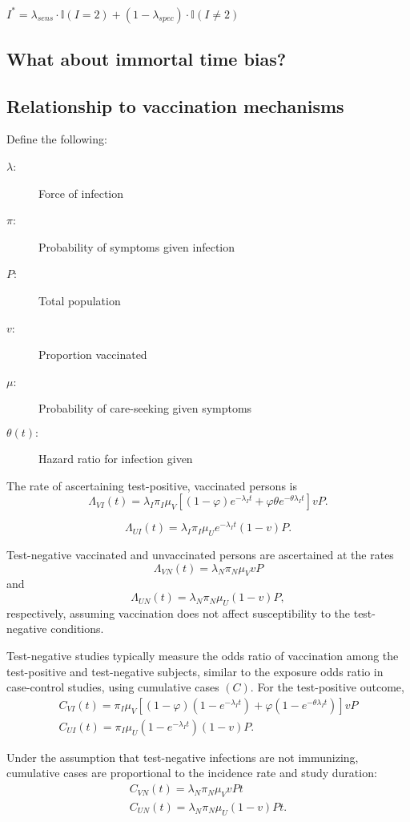 \begin{appendix}
$I^* = \lambda_{sens} \cdot \mathbb{I}(I = 2) + (1 - \lambda_{spec}) \cdot \mathbb{I}(I \neq 2)$

\subsection{What about immortal time bias?}

\subsection{Relationship to vaccination mechanisms}
Define the following:
\begin{description}
    \item[$\lambda$:] Force of infection 
    \item[$\pi$:] Probability of symptoms given infection
    \item[$P$:] Total population 
    \item[$v$:] Proportion vaccinated
    \item[$\mu$:] Probability of care-seeking given symptoms
    \item[$\theta(t):$] Hazard ratio for infection given 
\end{description}
The rate of ascertaining test-positive, vaccinated persons is
$$
\Lambda_{V I}(t)=\lambda_I \pi_I \mu_V[(1-\varphi) e^{-\lambda_I t} + \varphi \theta e^{-\theta \lambda_I t}] v P .
$$

$$
\Lambda_{U I}(t)=\lambda_I \pi_I \mu_U e^{-\lambda_I t}(1-v) P .
$$

Test-negative vaccinated and unvaccinated persons are ascertained at the rates
$$
\Lambda_{V N}(t)=\lambda_N \pi_N \mu_V v P
$$
and
$$
\Lambda_{U N}(t)=\lambda_N \pi_N \mu_U(1-v) P,
$$
respectively, assuming vaccination does not affect susceptibility to the test-negative conditions.

Test-negative studies typically measure the odds ratio of vaccination among the test-positive and test-negative subjects, similar to the exposure odds ratio in case-control studies, using cumulative cases $(C)$. For the test-positive outcome,
$$
\begin{gathered}
C_{V I}(t)=\pi_I \mu_V\left[(1-\varphi)\left(1-e^{-\lambda_I t}\right)+\varphi\left(1-e^{-\theta \lambda_I t}\right)\right] v P \\
C_{U I}(t)=\pi_I \mu_U\left(1-e^{-\lambda_I t}\right)(1-v) P .
\end{gathered}
$$

Under the assumption that test-negative infections are not immunizing, cumulative cases are proportional to the incidence rate and study duration:
$$
\begin{gathered}
C_{V N}(t)=\lambda_N \pi_N \mu_V v P t \\
C_{U N}(t)=\lambda_N \pi_N \mu_U(1-v) P t .
\end{gathered}
$$


\end{appendix}
